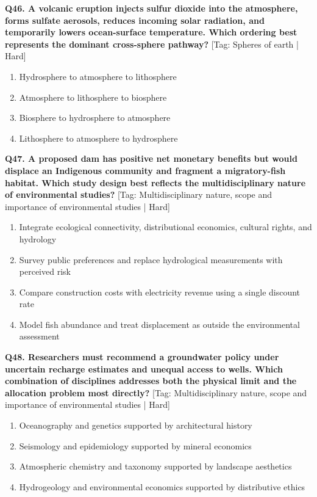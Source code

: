 \noindent\textbf{Q46. A volcanic eruption injects sulfur dioxide into the atmosphere, forms sulfate aerosols, reduces incoming solar radiation, and temporarily lowers ocean-surface temperature. Which ordering best represents the dominant cross-sphere pathway?} \hfill [Tag: Spheres of earth | Hard]
\begin{enumerate}[label=(\alph*),topsep=2pt,itemsep=1pt,partopsep=0pt,parsep=0pt]
    \item {Hydrosphere to atmosphere to lithosphere}
    \item {Atmosphere to lithosphere to biosphere}
    \item {Biosphere to hydrosphere to atmosphere}
    \item {Lithosphere to atmosphere to hydrosphere}
\end{enumerate}
\vspace{2mm}

\noindent\textbf{Q47. A proposed dam has positive net monetary benefits but would displace an Indigenous community and fragment a migratory-fish habitat. Which study design best reflects the multidisciplinary nature of environmental studies?} \hfill [Tag: Multidisciplinary nature, scope and importance of environmental studies | Hard]
\begin{enumerate}[label=(\alph*),topsep=2pt,itemsep=1pt,partopsep=0pt,parsep=0pt]
    \item {Integrate ecological connectivity, distributional economics, cultural rights, and hydrology}
    \item {Survey public preferences and replace hydrological measurements with perceived risk}
    \item {Compare construction costs with electricity revenue using a single discount rate}
    \item {Model fish abundance and treat displacement as outside the environmental assessment}
\end{enumerate}
\vspace{2mm}

\noindent\textbf{Q48. Researchers must recommend a groundwater policy under uncertain recharge estimates and unequal access to wells. Which combination of disciplines addresses both the physical limit and the allocation problem most directly?} \hfill [Tag: Multidisciplinary nature, scope and importance of environmental studies | Hard]
\begin{enumerate}[label=(\alph*),topsep=2pt,itemsep=1pt,partopsep=0pt,parsep=0pt]
    \item {Oceanography and genetics supported by architectural history}
    \item {Seismology and epidemiology supported by mineral economics}
    \item {Atmospheric chemistry and taxonomy supported by landscape aesthetics}
    \item {Hydrogeology and environmental economics supported by distributive ethics}
\end{enumerate}
\vspace{2mm}

